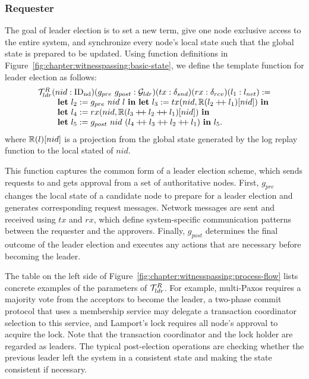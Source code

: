 \subsubsection{Requester}
The goal of leader election is to set a new term, give one node exclusive access to the
entire system, and synchronize every node's local state such that the
global state is prepared to be updated.
Using function definitions in Figure~\ref{fig:chapter:witnesspassing:basic-state}, we define the template function for leader election as follows:
$$
\begin{array}{l}
	\ldrfunction (nid: \nodeid) (g_{pre}\ g_{post}:  \gldrfunction)
	(tx: \sendfunction)(rx: \recvfunction)(l_1  :\networklog ) := \\
\ \ \ \ \ \ \ \mbox{\textbf{let}} \ l_2 := g_{pre}\ nid \ l  \ \mbox{\textbf{in}}\ \mbox{\textbf{let}}\ l_3 := tx(nid, \replay(l_2 \mdoubleplus l_1)[nid]) \ \mbox{\textbf{in}}  \\
\ \ \ \ \ \ \ \mbox{\textbf{let}} \ l_4 := rx(nid, \replay(l_3 \mdoubleplus l_2 \mdoubleplus l_1)[nid]) \
  \mbox{\textbf{in}}\\ 
\ \ \ \ \ \ \ \mbox{\textbf{let}} \ l_5 := g_{post}\ nid \ (l_4 \mdoubleplus l_3 \mdoubleplus l_2 \mdoubleplus l_1) \ \mbox{\textbf{in}} \ l_5. \\
\end{array}
$$
where $\mathbb{R}(l)[nid]$ is a projection from the global state generated by the log replay function to 
the local stated of $nid$.

This function captures the common form of a leader election scheme, which sends requests to
and gets approval from a set of authoritative nodes.
First, $g_{pre}$ changes the local state of a candidate node to prepare
for a leader election and generates corresponding request messages.
Network messages are sent and received using $tx$ and $rx$, which define system-specific
communication patterns between the requester and the approvers.
Finally, $g_{post}$ determines the final outcome of the
leader election and executes any actions that are necessary before becoming the leader.

The table on the left side of Figure~\ref{fig:chapter:witnesspassing:process-flow} lists concrete examples of the parameters of
$\mathcal{T}^{R}_{ldr}$. For example, multi-Paxos requires a majority vote from the acceptors to
become the leader, a two-phase commit protocol that uses a membership service may delegate
a transaction coordinator selection to this service, and Lamport's lock requires all node's
approval to acquire the lock. Note that the transaction coordinator and the lock holder are
regarded as leaders. The typical post-election operations are checking whether the
previous leader left the system in a consistent state and making the state consistent
if necessary. 


